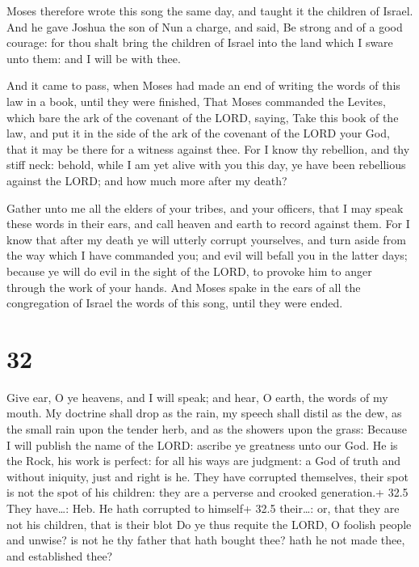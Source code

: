  Moses therefore wrote this song the same day, and taught
it the children of Israel.  And he gave Joshua the son of
Nun a charge, and said, Be strong and of a good courage: for thou shalt
bring the children of Israel into the land which I sware unto them: and
I will be with thee.

 And it came to pass, when Moses had made an end of
writing the words of this law in a book, until they were finished,
 That Moses commanded the Levites, which bare the ark of
the covenant of the LORD, saying,  Take this book of the
law, and put it in the side of the ark of the covenant of the LORD your
God, that it may be there for a witness against thee.  For
I know thy rebellion, and thy stiff neck: behold, while I am yet alive
with you this day, ye have been rebellious against the LORD; and how
much more after my death?

 Gather unto me all the elders of your tribes, and your
officers, that I may speak these words in their ears, and call heaven
and earth to record against them.  For I know that after my
death ye will utterly corrupt yourselves, and turn aside from the way
which I have commanded you; and evil will befall you in the latter days;
because ye will do evil in the sight of the LORD, to provoke him to
anger through the work of your hands.  And Moses spake in
the ears of all the congregation of Israel the words of this song, until
they were ended.

\hypertarget{section-31}{%
\section{32}\label{section-31}}

 Give ear, O ye heavens, and I will speak; and hear, O
earth, the words of my mouth.  My doctrine shall drop as the
rain, my speech shall distil as the dew, as the small rain upon the
tender herb, and as the showers upon the grass:  Because I
will publish the name of the LORD: ascribe ye greatness unto our God.
 He is the Rock, his work is perfect: for all his ways are
judgment: a God of truth and without iniquity, just and right is he.
 They have corrupted themselves, their spot is not the spot
of his children: they are a perverse and crooked generation.+ 32.5 They
have\ldots: Heb. He hath corrupted to himself+ 32.5 their\ldots: or,
that they are not his children, that is their blot  Do ye
thus requite the LORD, O foolish people and unwise? is not he thy father
that hath bought thee? hath he not made thee, and established thee?

